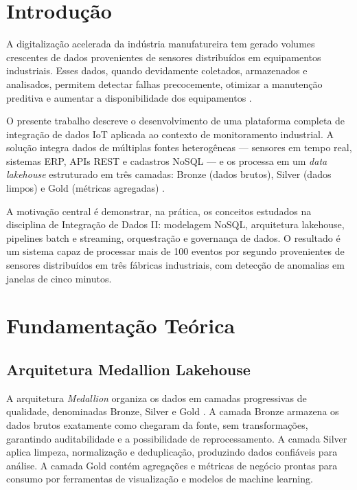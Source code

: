 \section{Introdução}

A digitalização acelerada da indústria manufatureira tem gerado volumes crescentes de dados
provenientes de sensores distribuídos em equipamentos industriais. Esses dados, quando
devidamente coletados, armazenados e analisados, permitem detectar falhas precocemente,
otimizar a manutenção preditiva e aumentar a disponibilidade dos equipamentos
\cite{lee2015cyber}.

O presente trabalho descreve o desenvolvimento de uma plataforma completa de integração
de dados IoT aplicada ao contexto de monitoramento industrial. A solução integra dados
de múltiplas fontes heterogêneas — sensores em tempo real, sistemas ERP, APIs REST e
cadastros NoSQL — e os processa em um \textit{data lakehouse} estruturado em três camadas:
Bronze (dados brutos), Silver (dados limpos) e Gold (métricas agregadas)
\cite{armbrust2021lakehouse}.

A motivação central é demonstrar, na prática, os conceitos estudados na disciplina de
Integração de Dados II: modelagem NoSQL, arquitetura lakehouse, pipelines batch e
streaming, orquestração e governança de dados. O resultado é um sistema capaz de
processar mais de 100 eventos por segundo provenientes de sensores distribuídos em
três fábricas industriais, com detecção de anomalias em janelas de cinco minutos.

\section{Fundamentação Teórica}

\subsection{Arquitetura Medallion Lakehouse}

A arquitetura \textit{Medallion} organiza os dados em camadas progressivas de qualidade,
denominadas Bronze, Silver e Gold \cite{databricks2021medallion}. A camada Bronze armazena
os dados brutos exatamente como chegaram da fonte, sem transformações, garantindo
auditabilidade e a possibilidade de reprocessamento. A camada Silver aplica limpeza,
normalização e deduplicação, produzindo dados confiáveis para análise. A camada Gold
contém agregações e métricas de negócio prontas para consumo por ferramentas de
visualização e modelos de machine learning.

